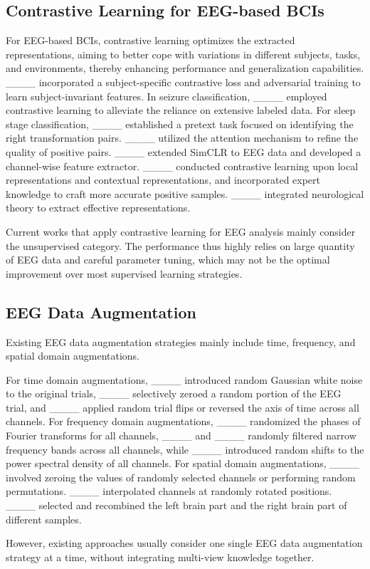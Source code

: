 \subsection{Contrastive Learning for EEG-based BCIs}
For EEG-based BCIs, contrastive learning optimizes the extracted representations, aiming to better cope with variations in different subjects, tasks, and environments, thereby enhancing performance and generalization capabilities. ____ incorporated a subject-specific contrastive loss and adversarial training to learn subject-invariant features. In seizure classification,  ____ employed contrastive learning to alleviate the reliance on extensive labeled data. For sleep stage classification,  ____ established a pretext task focused on identifying the right transformation pairs. ____ utilized the attention mechanism to refine the quality of positive pairs. ____ extended SimCLR to EEG data and developed a channel-wise feature extractor. ____ conducted contrastive learning upon local representations and contextual representations, and incorporated expert knowledge to craft more accurate positive samples.  ____ integrated neurological theory to extract effective representations.

Current works that apply contrastive learning for EEG analysis mainly consider the unsupervised category. The performance thus highly relies on large quantity of EEG data and careful parameter tuning, which may not be the optimal improvement over most supervised learning strategies.

\subsection{EEG Data Augmentation} 
Existing EEG data augmentation strategies mainly include time, frequency, and spatial domain augmentations.

For time domain augmentations, ____ introduced random Gaussian white noise to the original trials, ____ selectively zeroed a random portion of the EEG trial, and ____ applied random trial flips or reversed the axis of time across all channels. For frequency domain augmentations, ____ randomized the phases of Fourier transforms for all channels, ____ and ____ randomly filtered narrow frequency bands across all channels, while ____ introduced random shifts to the power spectral density of all channels. For spatial domain augmentations, ____ involved zeroing the values of randomly selected channels or performing random permutations. ____ interpolated channels at randomly rotated positions. ____ selected and recombined the left brain part and the right brain part of different samples.

However, existing approaches usually consider one single EEG data augmentation strategy at a time, without integrating multi-view knowledge together.